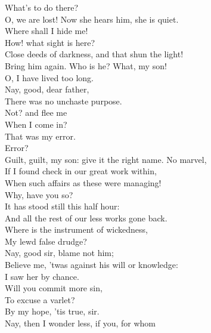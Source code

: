 \documentclass[a4paper,oneside]{memoir}
\begin{document}
\begin{drama*}
\subtlespeaks {}  What's to do there?\\
\facespeaks O, we are lost! Now she hears him, she is quiet.\\
\mammonspeaks Where shall I hide me!\\
\subtlespeaks {} How! what sight is here?\\
Close deeds of darkness, and that shun the light!\\
Bring him again. Who is he? What, my son!\\
O, I have lived too long.\\
\mammonspeaks {} Nay, good, dear father,\\
There was no unchaste purpose.\\
\subtlespeaks {} Not? and flee me\\
When I come in?\\
\mammonspeaks {} That was my error.\\
\subtlespeaks {} Error?\\
Guilt, guilt, my son: give it the right name. No marvel,\\
If I found check in our great work within,\\
When such affairs as these were managing!\\
\mammonspeaks Why, have you so?\\
\subtlespeaks {} It has stood still this half hour:\\
And all the rest of our less works gone back.\\
Where is the instrument of wickedness,\\
My lewd false drudge?\\
\mammonspeaks {} Nay, good sir, blame not him;\\
Believe me, 'twas against his will or knowledge:\\
I saw her by chance.\\
\subtlespeaks {} Will you commit more sin,\\
To excuse a varlet?\\
\mammonspeaks {} By my hope, 'tis true, sir.\\
\subtlespeaks Nay, then I wonder less, if you, for whom\\

\end{drama*}
\end{document}
